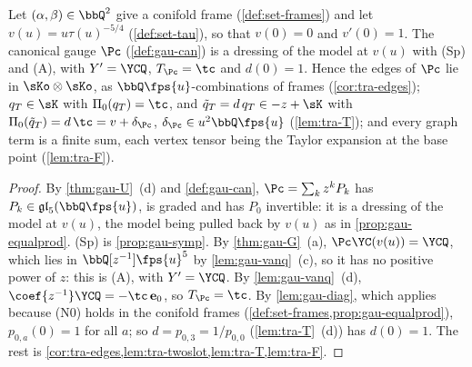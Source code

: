 \begin{prop}
\label{prop:tra-can}
Let $(\alpha,\beta)\in\bbQ^2$ give a conifold frame (\cref{def:set-frames}) and let $v(u) = u\tau(u)^{-5/4}$ (\cref{def:set-tau}), so that $v(0) = 0$ and $v'(0) = 1$. The canonical gauge $\Pc$ (\cref{def:gau-can}) is a dressing of the model at $v(u)$ with (Sp) and (A), with $Y' = \YCQ$, $T_{\Pc} = \tc$ and $d(0) = 1$. Hence the edges of $\Pc$ lie in $\sKo\otimes\sKo$, as $\bbQ\fps{u}$-combinations of frames (\cref{cor:tra-edges}); $q_T\in\sK$ with $\Pi_0(q_T) = \tc$, and $\tilde q_T = d\,q_T\in -z+\sK$ with $\Pi_0(\tilde q_T) = d\,\tc = v+\delta_{\Pc}$, $\delta_{\Pc}\in u^2\bbQ\fps{u}$ (\cref{lem:tra-T}); and every graph term is a finite sum, each vertex tensor being the Taylor expansion at the base point (\cref{lem:tra-F}).
\end{prop}

\begin{proof}
By \cref{thm:gau-U}~(d) and \cref{def:gau-can}, $\Pc = \sum_kz^kP_k$ has $P_k\in\mathfrak{gl}_5(\bbQ\fps{u})$, is graded and has $P_0$ invertible: it is a dressing of the model at $v(u)$, the model being pulled back by $v(u)$ as in \cref{prop:gau-equalprod}. (Sp) is \cref{prop:gau-symp}. By \cref{thm:gau-G}~(a), $\Pc\YC(v(u)) = \YCQ$, which lies in $\bbQ[z^{-1}]\fps{u}^5$ by \cref{lem:gau-vanq}~(c), so it has no positive power of $z$: this is (A), with $Y' = \YCQ$. By \cref{lem:gau-vanq}~(d), $\coef{z^{-1}}\YCQ = -\tc\,\mathbf e_0$, so $T_{\Pc} = \tc$. By \cref{lem:gau-diag}, which applies because (N0) holds in the conifold frames (\cref{def:set-frames,prop:gau-equalprod}), $p_{0,a}(0) = 1$ for all $a$; so $d = p_{0,3} = 1/p_{0,0}$ (\cref{lem:tra-T}~(d)) has $d(0) = 1$. The rest is \cref{cor:tra-edges,lem:tra-twoslot,lem:tra-T,lem:tra-F}.
\end{proof}
